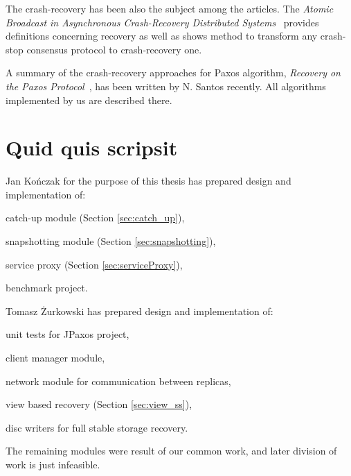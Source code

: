 The crash-recovery has been also the subject among the articles. The \textit{Atomic Broadcast in Asynchronous Crash-Recovery Distributed Systems}~\cite{rodriguez2000atomic} provides definitions concerning recovery as well as shows method to transform any crash-stop consensus protocol to crash-recovery one.

A summary of the crash-recovery approaches for Paxos algorithm, \textit{Recovery on the Paxos Protocol}~\cite{Nun10}, has been written by N. Santos recently. All algorithms implemented by us are described there.

\section{Quid quis scripsit}

Jan Kończak for the purpose of this thesis has prepared design and implementation of:
\begin{tightList}
  \item[\textbullet] catch-up module (Section \ref{sec:catch_up}),
  \item[\textbullet] snapshotting module (Section \ref{sec:snapshotting}),
  \item[\textbullet] service proxy  (Section \ref{sec:serviceProxy}),
  \item[\textbullet] benchmark project.
\end{tightList}

\noindent Tomasz Żurkowski has prepared design and implementation of:
\begin{tightList}
  \item[\textbullet] unit tests for JPaxos project,
  \item[\textbullet] client manager module, 
  \item[\textbullet] network module for communication between replicas,
  \item[\textbullet] view based recovery (Section \ref{sec:view_ss}),
  \item[\textbullet] disc writers for full stable storage recovery.
\end{tightList}

\noindent The remaining modules were result of our common work, and later division of work is just infeasible.
